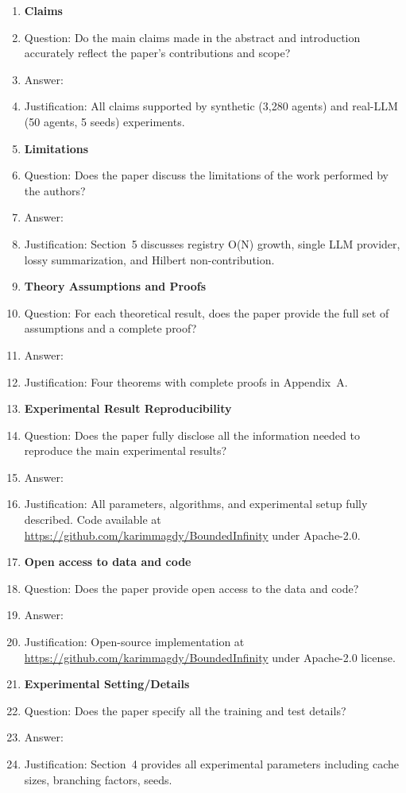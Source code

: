 \documentclass{article}
\begin{document}
\begin{enumerate}
\item {\bf Claims}
\item[] Question: Do the main claims made in the abstract and introduction accurately reflect the paper's contributions and scope?
\item[] Answer: \answerYes{}
\item[] Justification: All claims supported by synthetic (3,280 agents) and real-LLM (50 agents, 5 seeds) experiments.

\item {\bf Limitations}
\item[] Question: Does the paper discuss the limitations of the work performed by the authors?
\item[] Answer: \answerYes{}
\item[] Justification: Section~5 discusses registry O(N) growth, single LLM provider, lossy summarization, and Hilbert non-contribution.

\item {\bf Theory Assumptions and Proofs}
\item[] Question: For each theoretical result, does the paper provide the full set of assumptions and a complete proof?
\item[] Answer: \answerYes{}
\item[] Justification: Four theorems with complete proofs in Appendix~A.

\item {\bf Experimental Result Reproducibility}
\item[] Question: Does the paper fully disclose all the information needed to reproduce the main experimental results?
\item[] Answer: \answerYes{}
\item[] Justification: All parameters, algorithms, and experimental setup fully described. Code available at \url{https://github.com/karimmagdy/BoundedInfinity} under Apache-2.0.

\item {\bf Open access to data and code}
\item[] Question: Does the paper provide open access to the data and code?
\item[] Answer: \answerYes{}
\item[] Justification: Open-source implementation at \url{https://github.com/karimmagdy/BoundedInfinity} under Apache-2.0 license.

\item {\bf Experimental Setting/Details}
\item[] Question: Does the paper specify all the training and test details?
\item[] Answer: \answerYes{}
\item[] Justification: Section~4 provides all experimental parameters including cache sizes, branching factors, seeds.


\end{enumerate}
\end{document}
